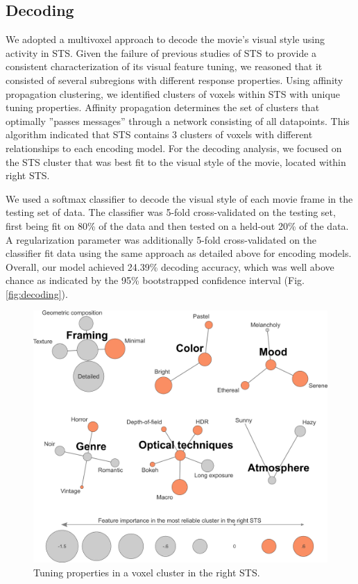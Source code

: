 \documentclass[10pt,twocolumn,letterpaper]{article}
\begin{document}
\subsection{Decoding}
We adopted a multivoxel approach to decode the movie's visual style using activity in STS. Given the failure of previous studies of STS to provide a consistent characterization of its visual feature tuning, we reasoned that it consisted of several subregions with different response properties. Using affinity propagation clustering, we identified clusters of voxels within STS with unique tuning properties. Affinity propagation determines the set of clusters that optimally ''passes messages'' through a network consisting of all datapoints. This algorithm indicated that STS contains 3 clusters of voxels with different relationships to each encoding model. For the decoding analysis, we focused on the STS cluster that was best fit to the visual style of the movie, located within right STS.

We used a softmax classifier to decode the visual style of each movie frame in the testing set of data. The classifier was 5-fold cross-validated on the testing set, first being fit on 80\% of the data and then tested on a held-out 20\% of the data. A regularization parameter was additionally 5-fold cross-validated on the classifier fit data using the same approach as detailed above for encoding models. Overall, our model achieved 24.39\% decoding accuracy, which was well above chance as indicated by the 95\% bootstrapped confidence interval  (Fig. \ref{fig:decoding}).


\begin{figure}
\begin{center}
\includegraphics[width=0.8\linewidth]{tuning.png}
\end{center}
   \caption{Tuning properties in a voxel cluster in the right STS.}
\label{fig:tuning}
\end{figure}
\end{document}
